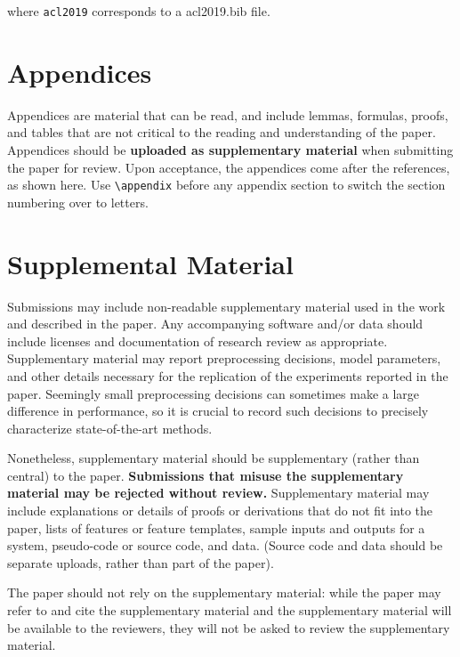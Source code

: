 \documentclass[11pt,a4paper]{article}
\begin{document}
where \verb|acl2019| corresponds to a acl2019.bib file.



\appendix

\section{Appendices}
\label{sec:appendix}
Appendices are material that can be read, and include lemmas, formulas, proofs, and tables that are not critical to the reading and understanding of the paper. 
Appendices should be \textbf{uploaded as supplementary material} when submitting the paper for review. Upon acceptance, the appendices come after the references, as shown here. Use
\verb|\appendix| before any appendix section to switch the section
numbering over to letters.


\section{Supplemental Material}
\label{sec:supplemental}
Submissions may include non-readable supplementary material used in the work and described in the paper. Any accompanying software and/or data should include licenses and documentation of research review as appropriate. Supplementary material may report preprocessing decisions, model parameters, and other details necessary for the replication of the experiments reported in the paper. Seemingly small preprocessing decisions can sometimes make a large difference in performance, so it is crucial to record such decisions to precisely characterize state-of-the-art methods. 

Nonetheless, supplementary material should be supplementary (rather
than central) to the paper. \textbf{Submissions that misuse the supplementary 
material may be rejected without review.}
Supplementary material may include explanations or details
of proofs or derivations that do not fit into the paper, lists of
features or feature templates, sample inputs and outputs for a system,
pseudo-code or source code, and data. (Source code and data should
be separate uploads, rather than part of the paper).

The paper should not rely on the supplementary material: while the paper
may refer to and cite the supplementary material and the supplementary material will be available to the
reviewers, they will not be asked to review the
supplementary material.
\end{document}
